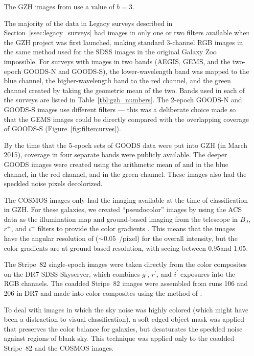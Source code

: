 \documentclass[twocolumn]{aastex6}
\begin{document}
\noindent The GZH images from \citet{gri12} use a value of $b=3$. 

The majority of the data in Legacy surveys described in Section~\ref{ssec:legacy_surveys} had images in only one or two filters available when the GZH project was first launched, making standard 3-channel RGB images in the same method used for the SDSS images in the original Galaxy Zoo impossible. For surveys with images in two bands (AEGIS, GEMS, and the two-epoch GOODS-N and GOODS-S), the lower-wavelength band was mapped to the blue channel, the higher-wavelength band to the red channel, and the green channel created by taking the geometric mean of the two. Bands used in each of the surveys are listed in Table~\ref{tbl:gzh_numbers}. The 2-epoch GOODS-N and GOODS-S images use different filters --- this was a deliberate choice made so that the GEMS images could be directly compared with the overlapping coverage of GOODS-S (Figure~\ref{fig:filtercurves}). 

By the time that the 5-epoch sets of GOODS data were put into GZH (in March 2015), coverage in four separate \hst{} bands were publicly available. The deeper GOODS images were created using the arithmetic mean of \Bband{} and \Vband{} in the blue channel, \Iband{} in the red channel, and \zband{} in the green channel. These images also had the speckled noise pixels decolorized. 

The COSMOS images only had the \Iband{} imaging available at the time of classification in GZH. For these galaxies, we created ``pseudocolor'' images by using the ACS \Iband{} data as the illumination map and ground-based imaging from the \subaru{} telescope in $B_J$, $r^+$, and $i^+$ filters to provide the color gradients \citep[see][for further details]{gri12}. This means that the images have the angular resolution of \hst{} ($\sim0.05$~\arcsec/pixel) for the overall intensity, but the color gradients are at ground-based resolution, with seeing between 0.95\arcsec and 1.05\arcsec \citep{tan07}.

The Stripe~82 single-epoch images were taken directly from the color composites on the DR7 SDSS Skyserver, which combines $g^{\prime}$, $r^{\prime}$, and $i^{\prime}$ exposures into the RGB channels. The coadded Stripe~82 images were assembled from runs 106 and 206 in DR7 and made into color composites using the method of \citet{lup04}.

To deal with images in which the sky noise was highly colored (which might have been a distraction to visual classification), a soft-edged object mask was applied that preserves the color balance for galaxies, but desaturates the speckled noise against regions of blank sky. This technique was applied only to the coadded Stripe~82 and the COSMOS images.
\end{document}
